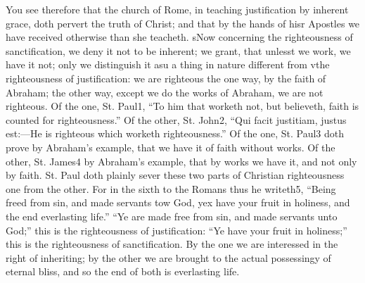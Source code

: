 You see therefore that the church of Rome, in teaching justification by inherent grace, doth pervert the truth of Christ; and that by the hands of hisr Apostles we have received otherwise than she teacheth. sNow concerning the righteousness of sanctification, we deny it not to be inherent; we grant, that unlesst we work, we have it not; only we distinguish it asu a thing in nature different from vthe righteousness of justification: we are righteous the one way, by the faith of Abraham; the other way, except we do the works of Abraham, we are not righteous. Of the one, St. Paul1, “To him that worketh not, but believeth, faith is counted for righteousness.” Of the other, St. John2, “Qui facit justitiam, justus est:—He is righteous which worketh righteousness.” Of the one, St. Paul3 doth prove by Abraham’s example, that we have it of faith without works. Of the other, St. James4 by Abraham’s example, that by works we have it, and not only by faith. St. Paul doth plainly sever these two parts of Christian righteousness one from the other. For in the sixth to the Romans thus he writeth5, “Being freed from sin, and made servants tow God, yex have your fruit in holiness, and the end everlasting life.” “Ye are made free from sin, and made servants unto God;” this is the righteousness of justification: “Ye have your fruit in holiness;” this is the righteousness of sanctification. By the one we are interessed in the right of inheriting; by the other we are brought to the actual possessingy of eternal bliss, and so the end of both is everlasting life.

